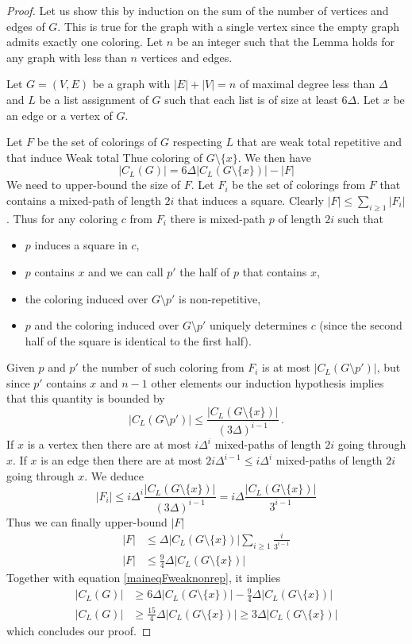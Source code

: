 \documentclass[a4paper,10pt]{article}
\begin{document}
\begin{proof}
 Let us show this by induction on the sum of the number of vertices and edges of $G$.
 This is true for the graph with a single vertex since the empty graph admits exactly one coloring.
 Let $n$ be an integer such that the Lemma holds for any graph with less than $n$ vertices and edges.
 
 Let $G=(V,E)$ be a graph with $|E|+|V|=n$ of maximal degree less than $\Delta$ and
 $L$ be a list assignment of $G$ such that each list is of size at least $6\Delta$.
 Let $x$ be an edge or a vertex of $G$.
 
 Let $F$ be the set of colorings of $G$ respecting $L$ that are weak total repetitive and
 that induce Weak total Thue coloring of $G\setminus\{x\}$. We then have
 \begin{equation}\label{maineqFweaknonrep}
  |C_L(G)|= 6\Delta|C_L(G\setminus\{x\})|- |F|
 \end{equation}
We need to upper-bound the size of $F$.
Let $F_i$ be the set of colorings from $F$ that contains a mixed-path of length $2i$ that induces a square.
Clearly $|F|\le\sum_{i\ge1} |F_i|$.
Thus for any coloring $c$ from $F_i$ there is mixed-path $p$ of length $2i$ such that 
\begin{itemize}
 \item $p$ induces a square in $c$,
 \item $p$ contains $x$ and we can call $p'$ the half of $p$ that contains $x$,
 \item the coloring induced over $G\setminus p'$ is non-repetitive,
 \item $p$ and the coloring induced over $G\setminus p'$ uniquely determines $c$ 
 (since the second half of the square is identical to the first half).
\end{itemize}
Given $p$ and $p'$ the number of such coloring from $F_i$ is at most
$|C_L(G\setminus p')|$, but since $p'$ contains $x$ and $n-1$ other elements our induction hypothesis implies that this quantity is bounded by
$$|C_L(G\setminus p')|\le \frac{|C_L(G\setminus \{x\})|}{(3\Delta)^{i-1}}\,.$$
If $x$ is a vertex then there are at most $i\Delta^i$ mixed-paths of length $2i$ going through $x$.
If $x$ is an edge then there are at most $2i\Delta^{i-1}\le i\Delta^i$ mixed-paths of length $2i$ going through $x$.
We deduce
$$|F_i|\le i\Delta^{i} \frac{|C_L(G\setminus \{x\})|}{(3\Delta)^{i-1}}= i\Delta \frac{|C_L(G\setminus \{x\})|}{3^{i-1}}$$
Thus we can finally upper-bound $|F|$
\begin{align*}
 |F|&\le\Delta |C_L(G\setminus \{x\})|\sum_{i\ge1}  \frac{i}{3^{i-1}}\\
 |F|&\le\frac{9}{4}\Delta |C_L(G\setminus \{x\})|
\end{align*}
Together with equation \eqref{maineqFweaknonrep}, it implies
\begin{align*}
|C_L(G)|&\ge 6\Delta|C_L(G\setminus\{x\})|-\frac{9}{4}\Delta |C_L(G\setminus \{x\})|\\
|C_L(G)|&\ge \frac{15}{4}\Delta|C_L(G\setminus\{x\})|\ge3\Delta|C_L(G\setminus\{x\})|
\end{align*}
which concludes our proof.
\end{proof}
\end{document}
